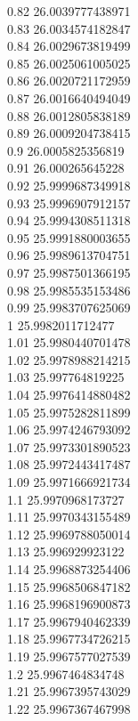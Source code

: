 {0.82	26.0039777438971\\
0.83	26.0034574182847\\
0.84	26.0029673819499\\
0.85	26.0025061005025\\
0.86	26.0020721172959\\
0.87	26.0016640494049\\
0.88	26.0012805838189\\
0.89	26.0009204738415\\
0.9	26.0005825356819\\
0.91	26.000265645228\\
0.92	25.9999687349918\\
0.93	25.9996907912157\\
0.94	25.9994308511318\\
0.95	25.9991880003655\\
0.96	25.9989613704751\\
0.97	25.9987501366195\\
0.98	25.9985535153486\\
0.99	25.9983707625069\\
1	25.9982011712477\\
1.01	25.9980440701478\\
1.02	25.9978988214215\\
1.03	25.997764819225\\
1.04	25.9976414880482\\
1.05	25.9975282811899\\
1.06	25.9974246793092\\
1.07	25.9973301890523\\
1.08	25.9972443417487\\
1.09	25.9971666921734\\
1.1	25.9970968173727\\
1.11	25.9970343155489\\
1.12	25.9969788050014\\
1.13	25.996929923122\\
1.14	25.9968873254406\\
1.15	25.9968506847182\\
1.16	25.9968196900873\\
1.17	25.9967940462339\\
1.18	25.9967734726215\\
1.19	25.9967577027539\\
1.2	25.9967464834748\\
1.21	25.9967395743029\\
1.22	25.9967367467998\\
}

